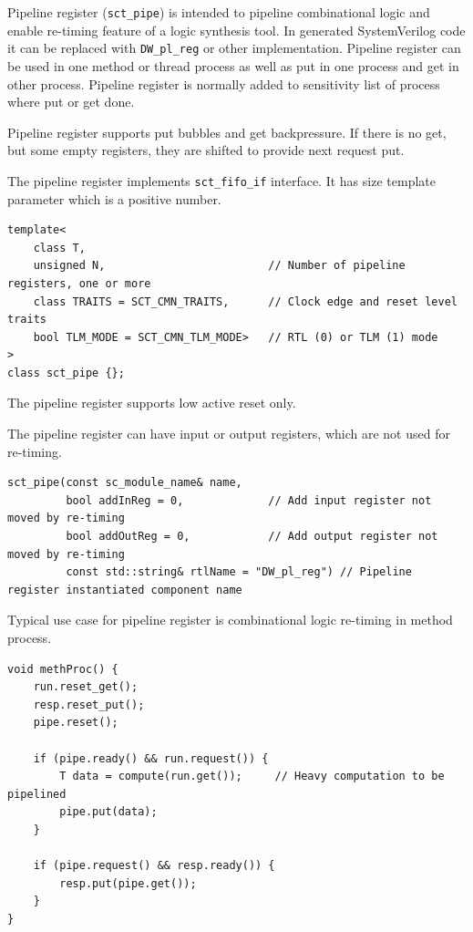 Pipeline register ({\tt sct\_pipe}) is intended to pipeline combinational logic and enable re-timing feature of a logic synthesis tool. In generated SystemVerilog code it can be replaced with {\tt DW\_pl\_reg} or other implementation. Pipeline register can be used in one method or thread process as well as put in one process and get in other process. Pipeline register is normally added to sensitivity list of process where put or get done.

Pipeline register supports put bubbles and get backpressure. If there is no get, but some empty registers, they are shifted to provide next request put.

The pipeline register implements {\tt sct\_fifo\_if} interface. It has size template parameter which is a positive number.

\begin{lstlisting}[style=mycpp]
template<
    class T, 
    unsigned N,                         // Number of pipeline registers, one or more
    class TRAITS = SCT_CMN_TRAITS,      // Clock edge and reset level traits
    bool TLM_MODE = SCT_CMN_TLM_MODE>   // RTL (0) or TLM (1) mode
>
class sct_pipe {};
\end{lstlisting}

The pipeline register supports low active reset only.

The pipeline register can have input or output registers, which are not used for re-timing.

\begin{lstlisting}[style=mycpp]
sct_pipe(const sc_module_name& name, 
         bool addInReg = 0,             // Add input register not moved by re-timing 
         bool addOutReg = 0,            // Add output register not moved by re-timing
         const std::string& rtlName = "DW_pl_reg") // Pipeline register instantiated component name
\end{lstlisting}
         
Typical use case for pipeline register is combinational logic re-timing in method process.

\begin{lstlisting}[style=mycpp]
void methProc() {
    run.reset_get();
    resp.reset_put();
    pipe.reset();

    if (pipe.ready() && run.request()) {
        T data = compute(run.get());     // Heavy computation to be pipelined
        pipe.put(data);
    }
  
    if (pipe.request() && resp.ready()) {
        resp.put(pipe.get());
    }
}
\end{lstlisting}



